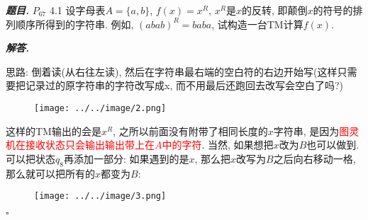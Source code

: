 \documentclass[10pt, a4paper, oneside]{ctexart}
\newenvironment{problem}{\begin{framed}\par\noindent\textbf{\textit{题目. }}}{\end{framed}\par}
\newenvironment{solution}{%
  \par\noindent\textbf{\textit{解答. }}\ignorespaces
}{%
  \hfill\ensuremath{\square}\par %
}
\begin{document}
    \begin{problem}
    $P_{67}$ 4.1 设字母表$A=\{a,b\}$, $f(x)=x^R$, $x^R$是$x$的反转, 即颠倒$x$的符号的排列顺序所得到的字符串. 例如, $(abab)^R=baba$, 试构造一台TM计算$f(x)$.
    \end{problem}
    \begin{solution}
    思路: 倒着读(从右往左读), 然后在字符串最右端的空白符的右边开始写(这样只需要把记录过的原字符串的字符改写成x, 而不用最后还跑回去改写会空白了吗?)
    \begin{figure}[h]
        \centering
        \texttt{[image: ../../image/2.png]}
    \end{figure}
    这样的TM输出的会是$x^R$, 之所以前面没有附带了相同长度的$x$字符串, 是因为\textcolor{red}{图灵机在接收状态只会输出输出带上在$A$中的字符}.
    \newpage
    当然, 如果想把$x$改为$B$也可以做到. 可以把状态$q_8$再添加一部分: 如果遇到的是$x$, 那么把$x$改写为$B$之后向右移动一格, 那么就可以把所有的$x$都变为$B$:
    \begin{figure}[h]
        \centering
        \texttt{[image: ../../image/3.png]}
    \end{figure}
    \end{solution}
\end{document}
